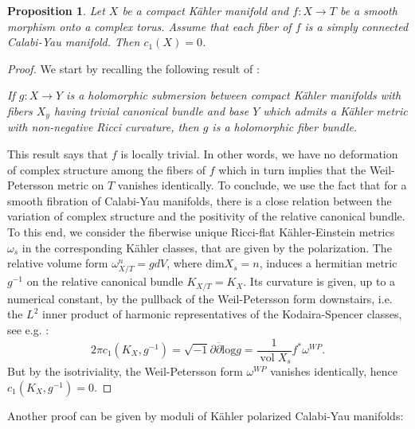 \documentclass[a4, 12pt]{amsart}
\newtheorem{prop}[thm]{Proposition}
\numberwithin{equation}{section}
\theoremstyle{definition}
\def \log{\mathrm{log}}
\def \dim{\mathrm{dim}}
\begin{document}
\begin{prop}\label{CY}
Let $X$ be a compact K\"ahler manifold and $f: X \to T$ be a smooth morphism onto a complex torus.
Assume that each fiber of $f$ is a simply connected Calabi-Yau manifold.
Then $c_1(X)=0$.
\end{prop}
\begin{proof}
We start by recalling the following result of \cite[Remark 3.2]{TZ14}:

\textit{
If $g : X \to Y$ is a holomorphic submersion between compact K\"ahler manifolds with fibers $X_y$ having trivial canonical bundle and base $Y$ which admits
a K\"ahler metric with non-negative Ricci curvature, then $g$ is a holomorphic
fiber bundle.
}

This result says that $f$ is locally trivial.
In other words, we have no deformation of complex structure among the fibers of $f$ which in turn implies that the Weil-Petersson metric on $T$ vanishes identically.
To conclude, we use the fact that for a smooth fibration of Calabi-Yau manifolds, there is a close relation between the variation of complex structure and the positivity of the relative canonical bundle. To this end, we consider the fiberwise unique Ricci-flat K\"ahler-Einstein metrics $\omega_s$ in the corresponding K\"ahler classes, that are given by the polarization. The relative volume form $\omega_{X/T}^{n}=gdV$, where $\dim X_s=n$, induces a hermitian metric $g^{-1}$ on the relative canonical bundle $K_{X/T}=K_X$. Its curvature is given, up to a numerical constant, by the pullback of the Weil-Petersson form downstairs, i.e. the $L^2$ inner product of harmonic representatives of the Kodaira-Spencer classes, see e.g. \cite[Eqn. 1.1]{BCS20}:
$$
2\pi c_1(K_X, g^{-1}) = \sqrt{-1}\partial \overline{\partial} \log g = \frac{1}{\operatorname{vol} X_s} f^*\omega^{WP}.
$$ 
But by the isotriviality, the Weil-Petersson form $\omega^{WP}$ vanishes identically, hence \\ $c_1(K_X, g^{-1})=0$.
\end{proof}
Another proof can be given by moduli of K\"ahler polarized Calabi-Yau manifolds:
\end{document}
